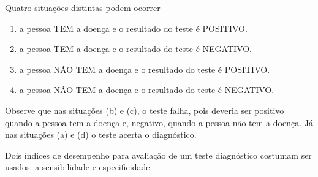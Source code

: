 Quatro situações distintas podem ocorrer
\begin{enumerate}
\item {} 
a pessoa TEM a doença e o resultado do teste é POSITIVO.

\item {} 
a pessoa TEM a doença e o resultado do teste é NEGATIVO.

\item {} 
a pessoa NÃO TEM a doença e o resultado do teste é POSITIVO.

\item {} 
a pessoa NÃO TEM a doença e o resultado do teste é NEGATIVO.

\end{enumerate}

Observe que nas situações (b) e (c), o teste falha, pois deveria ser positivo quando a pessoa tem a doença e, negativo, quando a pessoa não tem a doença. Já nas situações (a) e (d) o teste acerta o diagnóstico.

Dois índices de desempenho para avaliação de um teste diagnóstico costumam ser usados: a sensibilidade e especificidade.

